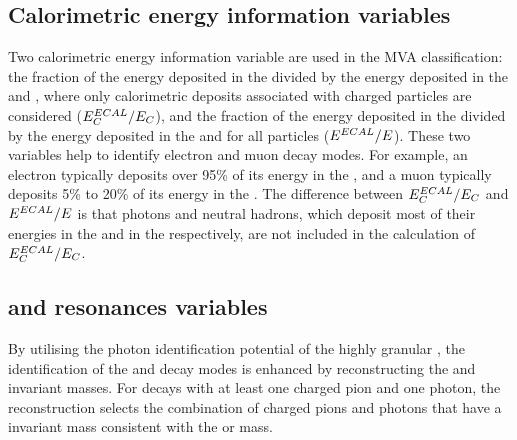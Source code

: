 \subsection{Calorimetric energy information variables}

Two calorimetric energy information variable are used in the MVA classification: the fraction of the energy  deposited in the \ECAL divided by the  energy deposited in the \ECAL and \HCAL, where only calorimetric deposits associated with charged particles are considered ($E^{ECAL}_{C} / E_{C}$), and the fraction of the energy  deposited in the \ECAL divided by the  energy deposited in the \ECAL and \HCAL for all particles ($ E^{ECAL} / E$). These  two variables help to identify electron and muon decay modes. For example, an electron typically deposits over 95\% of its energy in the \ECAL, and a muon typically deposits 5\% to 20\% of its energy in the \ECAL. The difference between $E^{ECAL}_{C} / E_{C}$ and  $ E^{ECAL} / E$ is that photons and neutral hadrons, which deposit most of their energies in the \ECAL and in the \HCAL respectively, are not included in the calculation of $E^{ECAL}_{C} / E_{C}$.



\subsection{\texorpdfstring{\decayRhoShort and \decayAiPhotonShort} \, resonances variables}



By utilising the photon identification potential of the highly granular \ECAL, the identification of the \decayRhoShort and \decayAiPhotonShort decay modes is enhanced  by reconstructing the \Prho and \Pai invariant masses. For decays with at least one charged pion and one photon, the reconstruction selects the combination of charged pions and photons that have a invariant mass consistent with the \Prho or \Pai mass.





